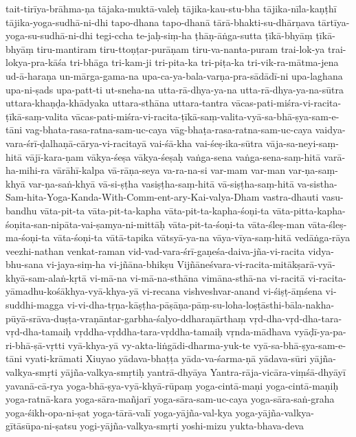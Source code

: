 {tait-tirīya-brāhma-ṇa
tājaka-muktā-valeḥ
tājika-kau-stu-bha
tājika-nīla-kaṇṭhī
tājika-yoga-sudhā-ni-dhi
tapo-dhana
tapo-dhanā
tārā-bhakti-su-dhārṇava
tārtīya-yoga-su-sudhā-ni-dhi
tegi-ccha
te-jaḥ-siṃ-ha
ṭhāṇ-āṅga-sutta
ṭīkā-bhyāṃ
ṭīkā-bhyāṃ
tiru-mantiram
tiru-ttoṇṭar-purāṇam
tiru-va-nanta-puram
trai-lok-ya
trai-lokya-pra-kāśa
tri-bhāga
tri-kam-ji
tri-pita-ka
tri-piṭa-ka
tri-vik-ra-mātma-jena
ud-ā-haraṇa
un-mārga-gama-na
upa-ca-ya-bala-varṇa-pra-sādādī-ni
upa-laghana
upa-ni-ṣads
upa-patt-ti
ut-sneha-na
utta-rā-dhya-ya-na
utta-rā-dhya-ya-na-sūtra
uttara-khaṇḍa-khādyaka
uttara-sthāna
uttara-tantra
vācas-pati-miśra-vi-racita-ṭīkā-saṃ-valita
vācas-pati-miśra-vi-racita-ṭīkā-saṃ-valita-vyā-sa-bhā-ṣya-sam-e-tāni
vag-bhata-rasa-ratna-sam-uc-caya
vāg-bhaṭa-rasa-ratna-sam-uc-caya
vaidya-vara-śrī-ḍalhaṇā-cārya-vi-racitayā
vai-śā-kha
vai-śeṣ-ika-sūtra
vāja-sa-neyi-saṃ-hitā
vājī-kara-ṇam
vākya-śeṣa
vākya-śeṣaḥ
vaṅga-sena
vaṅga-sena-saṃ-hitā
varā-ha-mihi-ra
vārāhī-kalpa
vā-rāṇa-seya
va-ra-na-si
var-mam
var-man
var-ṇa-saṃ-khyā
var-ṇa-saṅ-khyā
vā-si-ṣṭha
vasiṣṭha-saṃ-hitā
vā-siṣṭha-saṃ-hitā
va-sistha-Sam-hita-Yoga-Kanda-With-Comm-ent-ary-Kai-valya-Dham
vastra-dhauti
vasu-bandhu
vāta-pit-ta
vāta-pit-ta-kapha
vāta-pit-ta-kapha-śoṇi-ta
vāta-pitta-kapha-śoṇita-san-nipāta-vai-ṣamya-ni-mittāḥ
vāta-pit-ta-śoṇi-ta
vāta-śleṣ-man
vāta-śleṣ-ma-śoṇi-ta
vāta-śoṇi-ta
vātā-tapika
vātsyā-ya-na
vāya-vīya-saṃ-hitā
vedāṅga-rāya
veezhi-nathan
venkat-raman
vid-vad-vara-śrī-gaṇeśa-daiva-jña-vi-racita
vidya-bhu-sana
vi-jaya-siṃ-ha
vi-jñāna-bhikṣu
Vijñāneśvara-vi-racita-mitākṣarā-vyā-khyā-sam-alaṅ-kṛtā
vi-mā-na
vi-mā-na-sthāna
vimāna-sthā-na
vi-racitā
vi-racita-yāmadhu-kośākhya-vyā-khya-yā
vi-recana
vishveshvar-anand
vi-śiṣṭ-āṃśena
vi-suddhi-magga
vi-vi-dha-tṛṇa-kāṣṭha-pāṣāṇa-pāṃ-su-loha-loṣṭāsthi-bāla-nakha-pūyā-srāva-duṣṭa-vraṇāntar-garbha-śalyo-ddharaṇārthaṃ
vṛd-dha-vṛd-dha-tara-vṛd-dha-tamaiḥ
vṛddha-vṛddha-tara-vṛddha-tamaiḥ
vṛnda-mādhava
vyāḍī-ya-pa-ri-bhā-ṣā-vṛtti
vyā-khya-yā
vy-akta-liṅgādi-dharma-yuk-te
vyā-sa-bhā-ṣya-sam-e-tāni
vyati-krāmati
Xiuyao
yādava-bhaṭṭa
yāda-va-śarma-ṇā
yādava-sūri
yājña-valkya-smṛti
yājña-valkya-smṛtiḥ
yantrā-dhyāya
Yantra-rāja-vicāra-viṃśā-dhyāyī
yavanā-cā-rya
yoga-bhā-ṣya-vyā-khyā-rūpaṃ
yoga-cintā-maṇi
yoga-cintā-maṇiḥ
yoga-ratnā-kara
yoga-sāra-mañjarī
yoga-sāra-sam-uc-caya
yoga-sāra-saṅ-graha
yoga-śikh-opa-ni-ṣat
yoga-tārā-valī
yoga-yājña-val-kya
yoga-yājña-valkya-gītāsūpa-ni-ṣatsu
yogi-yājña-valkya-smṛti
yoshi-mizu
yukta-bhava-deva
}
